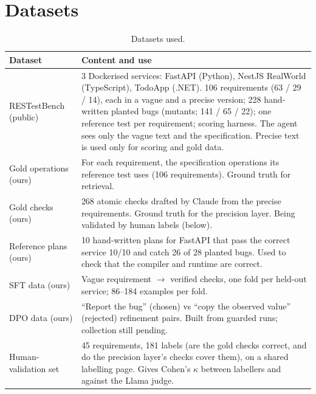 \documentclass[11pt,a4paper]{article}
\begin{document}
\section{Datasets}
\begin{table}[H]\centering\small
\begin{tabularx}{\linewidth}{@{}P{3.3cm}L@{}}
\toprule
\textbf{Dataset} & \textbf{Content and use}\\\midrule
RESTestBench~\cite{restestbench} (public) & 3 Dockerised services: FastAPI (Python), NestJS RealWorld (TypeScript), TodoApp (.NET). 106 requirements (63 / 29 / 14), each in a vague and a precise version; 228 hand-written planted bugs (mutants; 141 / 65 / 22); one reference test per requirement; scoring harness. The agent sees only the vague text and the specification. Precise text is used only for scoring and gold data.\\
Gold operations (ours) & For each requirement, the specification operations its reference test uses (106 requirements). Ground truth for retrieval.\\
Gold checks (ours) & 268 atomic checks drafted by Claude from the precise requirements. Ground truth for the precision layer. Being validated by human labels (below).\\
Reference plans (ours) & 10 hand-written plans for FastAPI that pass the correct service 10/10 and catch 26 of 28 planted bugs. Used to check that the compiler and runtime are correct.\\
SFT data (ours) & Vague requirement $\to$ verified checks, one fold per held-out service; 86--184 examples per fold.\\
DPO data (ours) & ``Report the bug'' (chosen) vs ``copy the observed value'' (rejected) refinement pairs. Built from guarded runs; collection still pending.\\
Human-validation set & 45 requirements, 181 labels (are the gold checks correct, and do the precision layer's checks cover them), on a shared labelling page. Gives Cohen's $\kappa$ between labellers and against the Llama judge.\\
\bottomrule
\end{tabularx}
\caption{Datasets used.}
\end{table}

\end{document}
